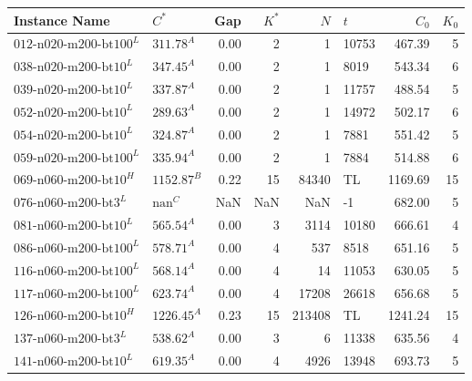 \begin{table}[ht]
    \small
    \centering
    \begin{tabular}{llrrrlrr}
        \toprule
        Instance Name                  & $C^*$              & Gap  & $K^*$ & $N$    & $t$   & $C_0$   & $K_0$ \\
        \midrule
        $\text{012-n020-m200-bt100}^L$ & $\text{311.78}^A$  & 0.00 & 2     & 1      & 10753 & 467.39  & 5     \\
        $\text{038-n020-m200-bt10}^L$  & $\text{347.45}^A$  & 0.00 & 2     & 1      & 8019  & 543.34  & 6     \\
        $\text{039-n020-m200-bt10}^L$  & $\text{337.87}^A$  & 0.00 & 2     & 1      & 11757 & 488.54  & 5     \\
        $\text{052-n020-m200-bt10}^L$  & $\text{289.63}^A$  & 0.00 & 2     & 1      & 14972 & 502.17  & 6     \\
        $\text{054-n020-m200-bt10}^L$  & $\text{324.87}^A$  & 0.00 & 2     & 1      & 7881  & 551.42  & 5     \\
        $\text{059-n020-m200-bt100}^L$ & $\text{335.94}^A$  & 0.00 & 2     & 1      & 7884  & 514.88  & 6     \\
        $\text{069-n060-m200-bt10}^H$  & $\text{1152.87}^B$ & 0.22 & 15    & 84340  & TL    & 1169.69 & 15    \\
        $\text{076-n060-m200-bt3}^L$   & $\text{nan}^C$     & NaN  & NaN   & NaN    & -1    & 682.00  & 5     \\
        $\text{081-n060-m200-bt10}^L$  & $\text{565.54}^A$  & 0.00 & 3     & 3114   & 10180 & 666.61  & 4     \\
        $\text{086-n060-m200-bt100}^L$ & $\text{578.71}^A$  & 0.00 & 4     & 537    & 8518  & 651.16  & 5     \\
        $\text{116-n060-m200-bt100}^L$ & $\text{568.14}^A$  & 0.00 & 4     & 14     & 11053 & 630.05  & 5     \\
        $\text{117-n060-m200-bt100}^L$ & $\text{623.74}^A$  & 0.00 & 4     & 17208  & 26618 & 656.68  & 5     \\
        $\text{126-n060-m200-bt10}^H$  & $\text{1226.45}^A$ & 0.23 & 15    & 213408 & TL    & 1241.24 & 15    \\
        $\text{137-n060-m200-bt3}^L$   & $\text{538.62}^A$  & 0.00 & 3     & 6      & 11338 & 635.56  & 4     \\
        $\text{141-n060-m200-bt10}^L$  & $\text{619.35}^A$  & 0.00 & 4     & 4926   & 13948 & 693.73  & 5     \\

\end{tabular}
\end{table}
